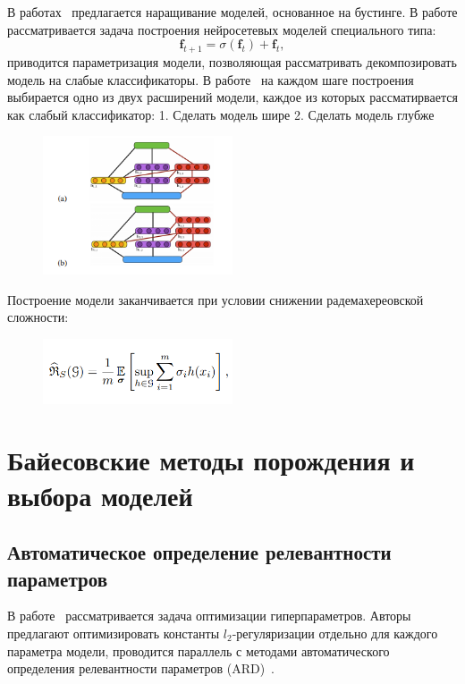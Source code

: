 В работах~\cite{boost_res, adanet} предлагается наращивание моделей, основанное на бустинге. В работе рассматривается задача построения нейросетевых моделей специального типа:
\[
    \mathbf{f}_{t+1} = \sigma(\mathbf{f}_t) + \mathbf{f}_t,
\]
приводится параметризация модели, позволяющая рассматривать декомпозировать модель на слабые классификаторы.
В работе~\cite{adanet} на каждом шаге построения выбирается одно из двух расширений модели, каждое из которых рассматирвается как слабый классификатор:
1. Сделать модель шире
2. Сделать модель глубже
\begin{figure}[H]
\includegraphics[width=0.5\textwidth]{./plots/arch_review_figs/adanet.png}
\end{figure}
Построение модели заканчивается при условии снижении радемахереовской сложности:
\begin{figure}[H]
\includegraphics[width=0.5\textwidth]{./plots/arch_review_figs/rad.png}
\end{figure}



\section{Байесовские методы порождения и выбора моделей}
\subsection{Автоматическое определение релевантности параметров}
В работе~\cite{hyper} рассматривается задача оптимизации гиперпараметров.  Авторы предлагают оптимизировать константы $l_2$-регуляризации отдельно для каждого параметра модели, проводится параллель с методами автоматического определения релевантности параметров (ARD)~\cite{MacKay}.

